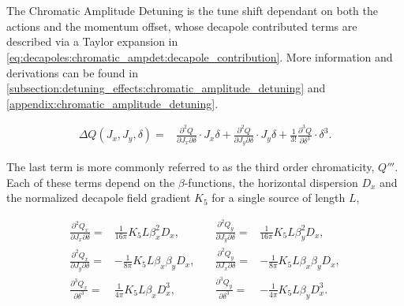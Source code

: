 \section{}

The Chromatic Amplitude Detuning is the tune shift dependant on both the actions and the momentum
offset, whose decapole contributed terms are described via a Taylor expansion in
\cref{eq:decapoles:chromatic_ampdet:decapole_contribution}. More information and derivations can
be found in \cref{subsection:detuning_effects:chromatic_amplitude_detuning} and
\cref{appendix:chromatic_amplitude_detuning}.

\begin{equation}
  \begin{aligned}
    \Delta Q(J_x, J_y, \delta) = 
    & \frac{\partial^2Q}{\partial J_x \partial \delta}    \cdot J_x\delta 
    + \frac{\partial^2 Q}{\partial J_y \partial \delta}   \cdot J_y\delta 
    + \frac{1}{3!} \frac{\partial^3 Q}{\partial \delta^3} \cdot \delta^3.
    \end{aligned}
    \label{eq:decapoles:chromatic_ampdet:decapole_contribution}
\end{equation}


The last term is more commonly referred to as the third order chromaticity, $Q'''$.  Each of these
terms depend on the $\beta$-functions, the horizontal dispersion $D_x$ and the normalized decapole
field gradient $K_5$ for a single source of length $L$,

\begin{equation}\begin{aligned}
  \frac{\partial^2 Q_x}{\partial J_x \partial \delta} =& \frac{1}{16 \pi} K_5L \beta_x^2 D_x,         &\quad
  \frac{\partial^2 Q_y}{\partial J_y \partial \delta} =& \frac{1}{16 \pi} K_5L \beta_y^2 D_x,
\\
  \frac{\partial^2 Q_x}{\partial J_y \partial \delta} =& -\frac{1}{8\pi} K_5L \beta_x \beta_y D_x,    &\quad
  \frac{\partial^2 Q_y}{\partial J_x \partial \delta} =& -\frac{1}{8\pi} K_5L \beta_x \beta_y D_x,
\\
  \frac{\partial^3 Q_x}{\partial \delta^3}            =& \frac{1}{4\pi} K_5L \beta_x D_x^3,           &\quad
  \frac{\partial^3 Q_y}{\partial \delta^3}            =& -\frac{1}{4\pi} K_5L \beta_y D_x^3.
\end{aligned}\end{equation}

